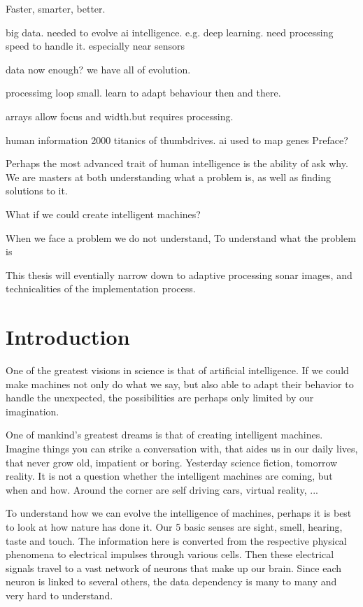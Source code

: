 \ifMonolithic\else\fi

Faster, smarter, better.

big data. needed to evolve ai intelligence. e.g. deep learning.  need processing speed to handle it. especially near sensors

data now enough? we have all of evolution.

processimg loop small. learn to adapt behaviour then and there.

arrays allow focus and width.but requires processing.

human information 2000 titanics of thumbdrives. ai used to map genes 
Preface?


Perhaps the most advanced trait of human intelligence is the ability of ask why. We are masters at both understanding what a problem is, as well as finding solutions to it. 

What if we could create intelligent machines? 

When we face a problem we do not understand, To understand what the problem is

This thesis will eventially narrow down to adaptive processing sonar images, and technicalities of the implementation process.


\chapter{Introduction}

One of the greatest visions in science is that of artificial intelligence. If we could make machines not only do what we say, but also able to adapt their behavior to handle the unexpected, the possibilities are perhaps only limited by our imagination.

One of mankind's greatest dreams is that of creating intelligent machines. Imagine things you can strike a conversation with, that aides us in our daily lives, that never grow old, impatient or boring. Yesterday science fiction, tomorrow reality. It is not a question whether the intelligent machines are coming, but when and how. Around the corner are self driving cars, virtual reality, ...

To understand how we can evolve the intelligence of machines, perhaps it is best to look at how nature has done it. Our 5 basic senses are sight, smell, hearing, taste and touch. The information here is converted from the respective physical phenomena to electrical impulses through various cells. Then these electrical signals travel to a vast network of neurons that make up our brain. Since each neuron is linked to several others, the data dependency is many to many and very hard to understand.


